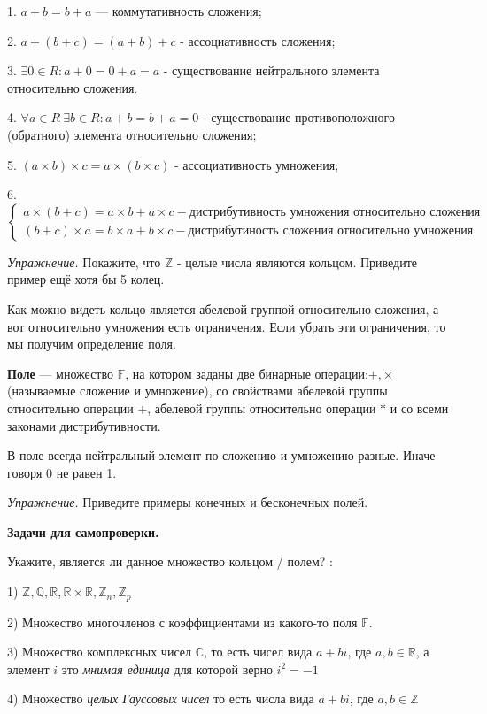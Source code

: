 1. $a+b=b+a$ — коммутативность сложения;

2. $a+(b+c) = (a+b)+c$ - ассоциативность сложения;

3. $\exists 0 \in R : a+0 = 0+a = a$ - существование нейтрального элемента относительно сложения.

\newpage

\hspace{3mm}

4. $\forall a \in R \ \exists b \in R: a+b = b+a = 0$ - существование противоположного (обратного) элемента относительно сложения;

5. $(a\times b)\times c = a\times (b \times c)$ - ассоциативность умножения;

6.
$
\begin{cases}
    a\times(b+c) = a\times b + a\times c  - \text{дистрибутивность умножения относительно сложения}\\
    (b+c)\times a = b\times a + b\times c - \text{дистрибутиность сложения относительно умножения}
\end{cases}
$

\hspace{5mm}

\textit{Упражнение.} Покажите, что $\mathbb{Z}$ - целые числа являются кольцом. Приведите пример ещё хотя бы 5 колец.

Как можно видеть кольцо является абелевой группой относительно сложения, а вот относительно умножения есть ограничения. Если убрать эти ограничения, то мы получим определение поля. 

\textbf{Поле} — множество $\mathbb{F}$, на котором заданы две бинарные операции:$+, \times$ (называемые сложение и умножение), со свойствами абелевой группы относительно операции $+$, абелевой группы относительно операции $*$ и со всеми законами дистрибутивности. 

В поле всегда нейтральный элемент по сложению и умножению разные. Иначе говоря 0 не равен 1. 

\textit{Упражнение.} Приведите примеры конечных и бесконечных полей.


\hspace{3mm}

\centerline{\textbf{\Large Задачи для самопроверки.}}

\hspace{3mm}

Укажите, является ли данное множество кольцом / полем? :

1) $\mathbb{Z}, \mathbb{Q}, \mathbb{R}, \mathbb{R}\times \mathbb{R}, \mathbb{Z}_n, \mathbb{Z}_p$

2) Множество многочленов с коэффициентами из какого-то поля $\mathbb{F}$.

3) Множество комплексных чисел $\mathbb{C}$, то есть чисел вида $a + bi$, где $a, b \in \mathbb{R}$, а элемент $i$ это \textit{мнимая единица} для которой верно $i^2 = -1$ 

4) Множество \textit{целых Гауссовых чисел} то есть числа вида $a+bi$, где $a, b \in \mathbb{Z}$